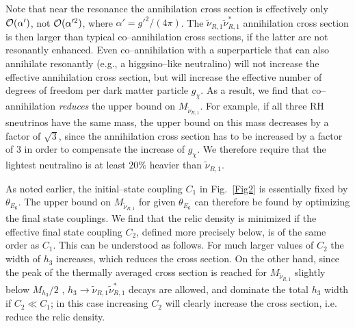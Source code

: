 \documentclass[a4paper,11pt]{article}
\begin{document}
Note that near the resonance the annihilation cross section is
effectively only ${\cal O}(\alpha')$, not ${\cal O}(\alpha'^2)$, where
$\alpha' = g'^2/(4\pi)$. The $\tilde \nu_{R,1} \tilde \nu_{R,1}^*$
annihilation cross section is then larger than typical
co--annihilation cross sections, if the latter are not resonantly
enhanced. Even co--annihilation with a superparticle that can also
annihilate resonantly (e.g., a higgsino--like neutralino) will not
increase the effective annihilation cross section, but will increase
the effective number of degrees of freedom per dark matter particle
$g_\chi$. As a result, we find that co--annihilation {\em reduces} the
upper bound on $M_{\tilde \nu_{R,1}}$. For example, if all three RH
sneutrinos have the same mass, the upper bound on this mass decreases
by a factor of $\sqrt{3}$, since the annihilation cross section has to
be increased by a factor of $3$ in order to compensate the increase of
$g_\chi$. We therefore require that the lightest neutralino is at
least $20\%$ heavier than $\tilde \nu_{R,1}$.

As noted earlier, the initial--state coupling $C_1$ in Fig.~\ref{Fig2}
is essentially fixed by $\theta_{E_6}$. The upper bound on
$M_{\tilde \nu_{R,1}}$ for given $\theta_{E_6}$ can therefore be found
by optimizing the final state couplings. We find that the relic
density is minimized if the effective final state coupling $C_2$,
defined more precisely below, is of the same order as $C_1$. This can
be understood as follows. For much larger values of $C_2$ the width of
$h_3$ increases, which reduces the cross section. On the other hand,
since the peak of the thermally averaged cross section is reached for
$M_{\tilde \nu_{R,1}}$ slightly below $M_{h_3}/2$
\cite{Griest:1990kh},
$h_3 \rightarrow \tilde \nu_{R,1} \tilde \nu_{R,1}^*$ decays are
allowed, and dominate the total $h_3$ width if $C_2 \ll C_1$; in this
case increasing $C_2$ will clearly increase the cross section,
i.e. reduce the relic density.
\end{document}

